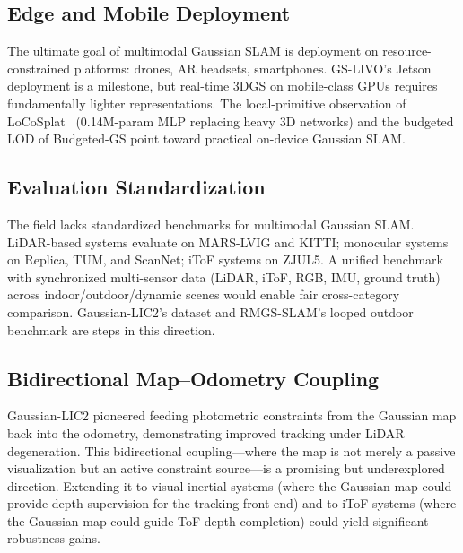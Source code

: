 \subsection{Edge and Mobile Deployment}

The ultimate goal of multimodal Gaussian SLAM is deployment on
resource-constrained platforms: drones, AR headsets, smartphones.  GS-LIVO's
Jetson deployment is a milestone, but real-time 3DGS on mobile-class GPUs
requires fundamentally lighter representations.  The local-primitive
observation of LoCoSplat~\cite{wang2026_locosplat} (0.14M-param MLP replacing
heavy 3D networks) and the budgeted LOD of Budgeted-GS point toward
practical on-device Gaussian SLAM.

\subsection{Evaluation Standardization}

The field lacks standardized benchmarks for multimodal Gaussian SLAM.
LiDAR-based systems evaluate on MARS-LVIG and KITTI; monocular systems on
Replica, TUM, and ScanNet; iToF systems on ZJUL5.  A unified benchmark with
synchronized multi-sensor data (LiDAR, iToF, RGB, IMU, ground truth) across
indoor/outdoor/dynamic scenes would enable fair cross-category comparison.
Gaussian-LIC2's dataset and RMGS-SLAM's looped outdoor benchmark are steps
in this direction.

\subsection{Bidirectional Map--Odometry Coupling}

Gaussian-LIC2 pioneered feeding photometric constraints from the Gaussian
map back into the odometry, demonstrating improved tracking under LiDAR
degeneration.  This bidirectional coupling---where the map is not merely a
passive visualization but an active constraint source---is a promising but
underexplored direction.  Extending it to visual-inertial systems (where the
Gaussian map could provide depth supervision for the tracking front-end) and
to iToF systems (where the Gaussian map could guide ToF depth completion)
could yield significant robustness gains.
